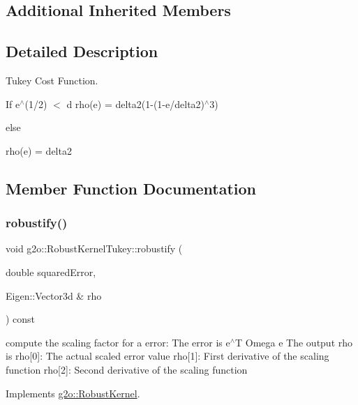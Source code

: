 \subsection*{Additional Inherited Members}


\subsection{Detailed Description}
Tukey Cost Function. 

If e$^\wedge$(1/2) $<$ d rho(e) = delta2(1-\/(1-\/e/delta2)$^\wedge$3)

else

rho(e) = delta2 

\subsection{Member Function Documentation}
\mbox{\label{classg2o_1_1_robust_kernel_tukey_a415fbc0b4033a8330700e66c60305b13}} 
\subsubsection{\texorpdfstring{robustify()}{robustify()}}
{\footnotesize\ttfamily void g2o\+::\+Robust\+Kernel\+Tukey\+::robustify (\begin{DoxyParamCaption}\item[{double}]{squared\+Error,  }\item[{Eigen\+::\+Vector3d \&}]{rho }\end{DoxyParamCaption}) const\hspace{0.3cm}{\ttfamily [virtual]}}

compute the scaling factor for a error\+: The error is e$^\wedge$T Omega e The output rho is rho\mbox{[}0\mbox{]}\+: The actual scaled error value rho\mbox{[}1\mbox{]}\+: First derivative of the scaling function rho\mbox{[}2\mbox{]}\+: Second derivative of the scaling function 

Implements \mbox{\hyperlink{classg2o_1_1_robust_kernel_ab47b071a0cfe466be063f0104bc41d0f}{g2o\+::\+Robust\+Kernel}}.

\mbox{\label{classg2o_1_1_robust_kernel_tukey_a0602ba130364506d65fb86f3473209aa}} 
